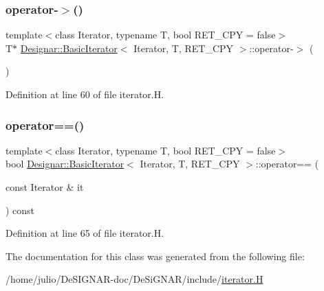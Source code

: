 \subsubsection{\texorpdfstring{operator-\/$>$()}{operator->()}}
{\footnotesize\ttfamily template$<$class Iterator, typename T, bool R\+E\+T\+\_\+\+C\+PY = false$>$ \\
T$\ast$ \hyperlink{class_designar_1_1_basic_iterator}{Designar\+::\+Basic\+Iterator}$<$ Iterator, T, R\+E\+T\+\_\+\+C\+PY $>$\+::operator-\/$>$ (\begin{DoxyParamCaption}{ }\end{DoxyParamCaption})\hspace{0.3cm}{\ttfamily [inline]}}



Definition at line 60 of file iterator.\+H.

\mbox{\label{class_designar_1_1_basic_iterator_abaca601c4d1d4ff27429426437abbf02}} 
\subsubsection{\texorpdfstring{operator==()}{operator==()}}
{\footnotesize\ttfamily template$<$class Iterator, typename T, bool R\+E\+T\+\_\+\+C\+PY = false$>$ \\
bool \hyperlink{class_designar_1_1_basic_iterator}{Designar\+::\+Basic\+Iterator}$<$ Iterator, T, R\+E\+T\+\_\+\+C\+PY $>$\+::operator== (\begin{DoxyParamCaption}\item[{const Iterator \&}]{it }\end{DoxyParamCaption}) const\hspace{0.3cm}{\ttfamily [inline]}}



Definition at line 65 of file iterator.\+H.



The documentation for this class was generated from the following file\+:\begin{DoxyCompactItemize}
\item 
/home/julio/\+De\+S\+I\+G\+N\+A\+R-\/doc/\+De\+Si\+G\+N\+A\+R/include/\hyperlink{iterator_8_h}{iterator.\+H}\end{DoxyCompactItemize}
